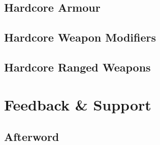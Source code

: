 \newpage
\chapter{Hardcore Armour} \label{ch:hc.hardcore_armour}


\newpage
\chapter{Hardcore Weapon Modifiers} \label{ch:hc.hardcore_weapon}


\newpage
\chapter{Hardcore Ranged Weapons} \label{ch:hc.hardcore_ranged}


\cleardoublepage
\part{Feedback \& \newline Support} \label{part:feedback_support}

\newpage
\chapter{Afterword} \label{ch:fs.afterword}


%
%

%


